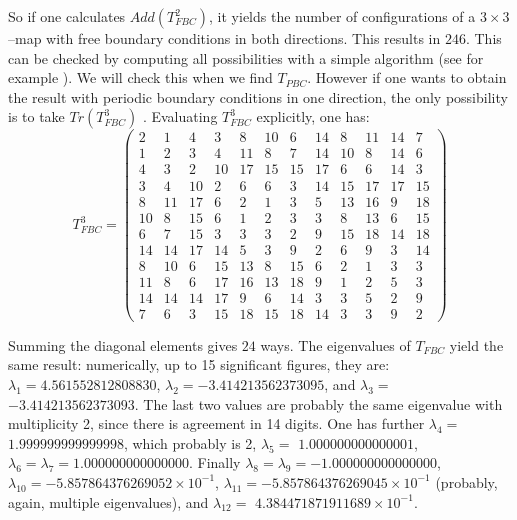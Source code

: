\documentclass[3p, 10pt, onecolumn]{elsarticle}
\begin{document}
So if one calculates $Add(T_{FBC}^{2})$, it yields the number of
configurations of a $3\times3$--map with free boundary conditions in both
directions. This results in $246$. This can be checked by computing all
possibilities with a simple algorithm (see for example \cite{rdasilvaEJP}).
We will check this when we find $T_{PBC}$. However if one wants to obtain
the result with periodic boundary conditions in one direction, the only
possibility is to take $Tr(T_{FBC}^{3})$ . Evaluating $T_{FBC}^{3}$
explicitly, one has: 
\begin{equation}
T_{FBC}^{3}=\left( \allowbreak 
\begin{array}{cccccccccccc}
2 & 1 & 4 & 3 & 8 & 10 & 6 & 14 & 8 & 11 & 14 & 7 \\ 
1 & 2 & 3 & 4 & 11 & 8 & 7 & 14 & 10 & 8 & 14 & 6 \\ 
4 & 3 & 2 & 10 & 17 & 15 & 15 & 17 & 6 & 6 & 14 & 3 \\ 
3 & 4 & 10 & 2 & 6 & 6 & 3 & 14 & 15 & 17 & 17 & 15 \\ 
8 & 11 & 17 & 6 & 2 & 1 & 3 & 5 & 13 & 16 & 9 & 18 \\ 
10 & 8 & 15 & 6 & 1 & 2 & 3 & 3 & 8 & 13 & 6 & 15 \\ 
6 & 7 & 15 & 3 & 3 & 3 & 2 & 9 & 15 & 18 & 14 & 18 \\ 
14 & 14 & 17 & 14 & 5 & 3 & 9 & 2 & 6 & 9 & 3 & 14 \\ 
8 & 10 & 6 & 15 & 13 & 8 & 15 & 6 & 2 & 1 & 3 & 3 \\ 
11 & 8 & 6 & 17 & 16 & 13 & 18 & 9 & 1 & 2 & 5 & 3 \\ 
14 & 14 & 14 & 17 & 9 & 6 & 14 & 3 & 3 & 5 & 2 & 9 \\ 
7 & 6 & 3 & 15 & 18 & 15 & 18 & 14 & 3 & 3 & 9 & 2%
\end{array}%
\right)
\end{equation}

Summing the diagonal elements gives $24$ ways. The eigenvalues of $T_{FBC}$
yield the same result: numerically, up to 15 significant figures, they are: $%
\lambda _{1}=4.561552812808830$, $\lambda _{2}=-3.414213562373095$, and $%
\lambda _{3}=$ $-3.414213562373093$. The last two values are probably the
same eigenvalue with multiplicity 2, since there is agreement in 14 digits.
One has further $\lambda _{4}=$ $1.999999999999998$, which probably is 2, $%
\lambda _{5}=$ $1.000000000000001$, $\lambda _{6}=\lambda
_{7}=1.000000000000000$. Finally $\lambda _{8}=\lambda
_{9}=-1.000000000000000$, $\lambda _{10}=-5.857864376269052\times 10^{-1}$, $%
\lambda _{11}=-5.857864376269045\times 10^{-1}$ (probably, again, multiple
eigenvalues), and $\lambda _{12}=$ $4.384471871911689\times 10^{-1}$.
\end{document}
